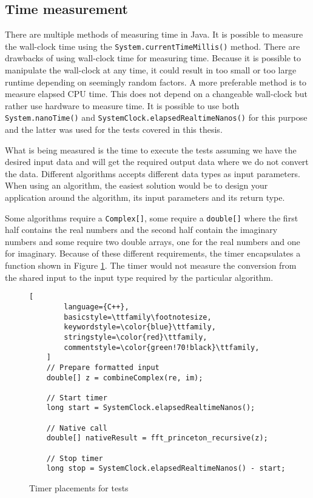 \subsection{Time measurement}
There are multiple methods of measuring time in Java. It is possible to measure the wall-clock time using the \texttt{System.currentTimeMillis()} method. There are drawbacks of using wall-clock time for measuring time. Because it is possible to manipulate the wall-clock at any time, it could result in too small or too large runtime depending on seemingly random factors. A more preferable method is to measure elapsed CPU time. This does not depend on a changeable wall-clock but rather use hardware to measure time. It is possible to use both \texttt{System.nanoTime()} and \texttt{SystemClock.elapsedRealtimeNanos()} for this purpose and the latter was used for the tests covered in this thesis.

What is being measured is the time to execute the tests assuming we have the desired input data and will get the required output data where we do not convert the data. Different algorithms accepts different data types as input parameters. When using an algorithm, the easiest solution would be to design your application around the algorithm, its input parameters and its return type.

Some algorithms require a \texttt{Complex[]}, some require a \texttt{double[]} where the first half contains the real numbers and the second half contain the imaginary numbers and some require two double arrays, one for the real numbers and one for imaginary. Because of these different requirements, the timer encapsulates a function shown in Figure \ref{fig:timer:pos}. The timer would not measure the conversion from the shared input to the input type required by the particular algorithm.

\begin{figure}
\begin{lstlisting}[
        language={C++},
        basicstyle=\ttfamily\footnotesize,
        keywordstyle=\color{blue}\ttfamily,
        stringstyle=\color{red}\ttfamily,
        commentstyle=\color{green!70!black}\ttfamily,
    ]
    // Prepare formatted input
    double[] z = combineComplex(re, im);

    // Start timer
    long start = SystemClock.elapsedRealtimeNanos();

    // Native call
    double[] nativeResult = fft_princeton_recursive(z);

    // Stop timer
    long stop = SystemClock.elapsedRealtimeNanos() - start;
\end{lstlisting}
\caption{Timer placements for tests}
\label{fig:timer:pos}
\end{figure}

